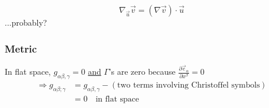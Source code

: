 \documentclass[a4paper]{article} %
\begin{document}
\begin{equation}
\nabla_{\vec{u}}\vec{v}=(\nabla\vec{v})\cdot \vec{u}
\end{equation}
...probably?


\subsubsection{Metric}
In flat space, $g_{\alpha\beta , \gamma}=0$ \underline{and} $\Gamma$'s are zero because $\frac{\partial\vec{e}_{\alpha}}{\partial x^{\beta}}=0$
\begin{align}
\Rightarrow g_{\alpha\beta;\gamma}&=g_{\alpha\beta,\gamma}-(\text{two terms involving Christoffel symbols})\\
&=0 \quad\text{in flat space}
\end{align}

\end{document}
